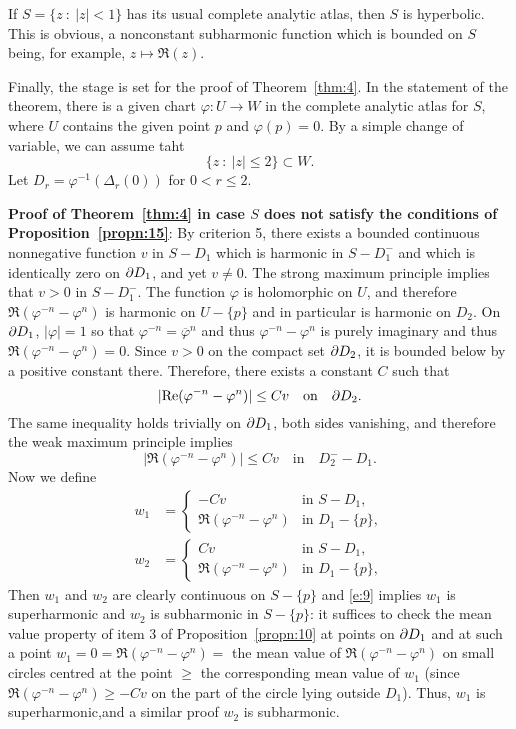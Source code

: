 \documentclass[a4paper,11pt]{article}
\begin{document}
\begin{exmp}
  \label{eg:3}
  If $S = \{z ~:~ |z| < 1\}$ has its usual complete analytic atlas,
  then $S$ is hyperbolic.  This is obvious, a nonconstant subharmonic
  function which is bounded on $S$ being, for example, $z \mapsto
  \Re(z)$.
\end{exmp}

Finally, the stage is set for the proof of Theorem~\ref{thm:4}.  In
the statement of the theorem, there is a given chart $\varphi : U \to
W$ in the complete analytic atlas for $S$, where $U$ contains the
given point $p$ and $\varphi(p) = 0$.  By a simple change of variable,
we can assume taht
$$
\{ z ~:~ |z| \le 2 \} \subset W.
$$
Let $D_r = \varphi^{-1}(\Delta_r(0))$ for $0 < r \le 2$.

\textbf{Proof of Theorem~\ref{thm:4} in case $S$ does not satisfy the
  conditions of Proposition~\ref{propn:15}}:  By criterion 5, there
exists a bounded continuous nonnegative function $v$ in $S - D_1$
which is harmonic in $S - D_1^-$ and which is identically zero on $\partial
D_1$, and yet $v \ne 0$.  The strong maximum principle implies that $v
> 0$ in $S-D_1^-$.  The function $\varphi$ is holomorphic on $U$, and 
therefore $\Re(\varphi^{-n} - \varphi^n)$ is harmonic on $U-\{p\}$ and
in particular is harmonic on $D_2$.  On $\partial D_1$, $|\varphi| = 1$ so
that $\varphi^{-n} = \overline{\varphi}^n$ and thus $\varphi^{-n} -
\varphi^n$ is purely imaginary and thus $\Re(\varphi^{-n} - \varphi^n)
= 0$.  Since $v > 0$ on the compact set $\partial D_2$, it is bounded below
by a positive constant there.  Therefore, there exists a constant $C$
such that
$$
|\Re(\varphi^{-n} - \varphi^n)| \le C v \quad \text{on}\quad \p D_2.
$$
The same inequality holds trivially on $\partial D_1$, both sides vanishing,
and therefore the weak maximum principle implies
\begin{equation}
  \label{e:9}
  |\Re(\varphi^{-n} - \varphi^n)| \le Cv \quad\text{in}\quad D_2^- - D_1.
\end{equation}
Now we define
$$
\begin{aligned}
  w_1 &=
  \begin{cases}
    -Cv &\text{in }S-D_1,\\
    \Re(\varphi^{-n} - \varphi^n) &\text{in }D_1-\{p\},
  \end{cases}\\
  w_2 &=
  \begin{cases}
    Cv &\text{in }S-D_1,\\
    \Re(\varphi^{-n} - \varphi^n) &\text{in }D_1-\{p\},
  \end{cases}  
\end{aligned}
$$
Then $w_1$ and $w_2$ are clearly continuous on $S-\{p\}$ and
\eqref{e:9} implies $w_1$ is superharmonic and $w_2$ is subharmonic in
$S - \{p\}$: it suffices to check the mean value property of
item 3 of Proposition~\ref{propn:10} at points on $\partial D_1$ and at such
a point $w_1 = 0 = \Re(\varphi^{-n} - \varphi^n) = $ the mean value of
$\Re(\varphi^{-n} - \varphi^n)$ on small circles centred at the point
$\ge$ the corresponding mean value of $w_1$ (since $\Re(\varphi^{-n} -
\varphi^n) \ge - Cv$ on the part of the circle lying outside $D_1$).
Thus, $w_1$ is superharmonic,and a similar proof $w_2$ is
subharmonic.
\end{document}
